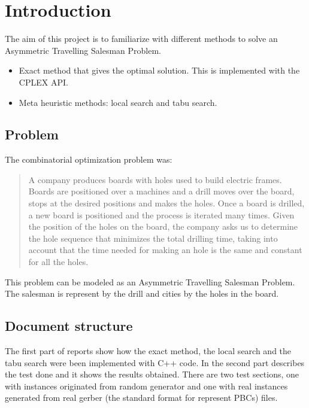 \section{Introduction}
	The aim of this project is to familiarize with different methods to solve an Asymmetric Travelling Salesman Problem.
	\begin{itemize}
		\item Exact method that gives the optimal solution. This is implemented with the CPLEX API.
		\item Meta heuristic methods: local search and tabu search.
	\end{itemize}

	\subsection{Problem}
		The combinatorial optimization problem was:
		\begin{quote}
				A company produces boards with holes used to build electric frames.  Boards are positioned over a machines and a drill moves over the board, stops at the desired positions and makes the holes.  Once a board is drilled, a new board is positioned and the process is iterated many times.  Given the position of the holes on the board, the company asks us to determine the hole sequence that minimizes the total drilling time, taking into account that the time needed for making an hole is the same and constant for all the holes.
		\end{quote}
	
		This problem can be modeled as an Asymmetric Travelling Salesman Problem. The salesman is represent by the drill and cities by the holes in the board.
	
	\subsection{Document structure}
		The first part of reports show how the exact method, the local search and the tabu search were been implemented with C++ code. In the second part describes the test done and it shows the results obtained. There are two test sections, one with instances originated from random generator and one with real instances generated from real gerber (the standard format for represent PBCs) files.